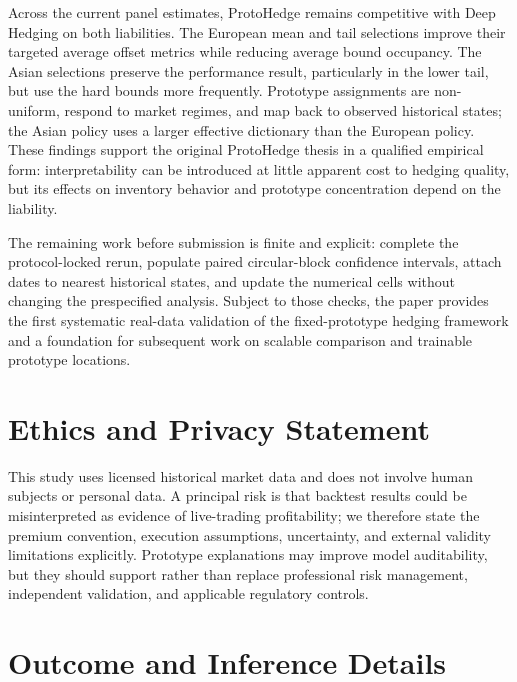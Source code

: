 \documentclass[sigconf]{acmart}
\begin{document}
Across the current panel estimates, ProtoHedge remains competitive with Deep
Hedging on both liabilities. The European mean and tail selections improve
their targeted average offset metrics while reducing average bound occupancy.
The Asian selections preserve the performance result, particularly in the
lower tail, but use the hard bounds more frequently. Prototype assignments are
non-uniform, respond to market regimes, and map back to observed historical
states; the Asian policy uses a larger effective dictionary than the European
policy. These findings support the original ProtoHedge thesis in a qualified
empirical form: interpretability can be introduced at little apparent cost to
hedging quality, but its effects on inventory behavior and prototype
concentration depend on the liability.

The remaining work before submission is finite and explicit: complete the
protocol-locked rerun, populate paired circular-block confidence intervals,
attach dates to nearest historical states, and update the numerical cells
without changing the prespecified analysis. Subject to those checks, the paper
provides the first
systematic real-data validation of the fixed-prototype hedging framework and a
foundation for subsequent work on scalable comparison and trainable prototype
locations.
\section*{Ethics and Privacy Statement}

This study uses licensed historical market data and does not involve human
subjects or personal data. A principal risk is that backtest results could be
misinterpreted as evidence of live-trading profitability; we therefore state
the premium convention, execution assumptions, uncertainty, and external
validity limitations explicitly. Prototype explanations may improve model
auditability, but they should support rather than replace professional risk
management, independent validation, and applicable regulatory controls.




\appendix

\section{Outcome and Inference Details}
\label{app:inference}
\end{document}
